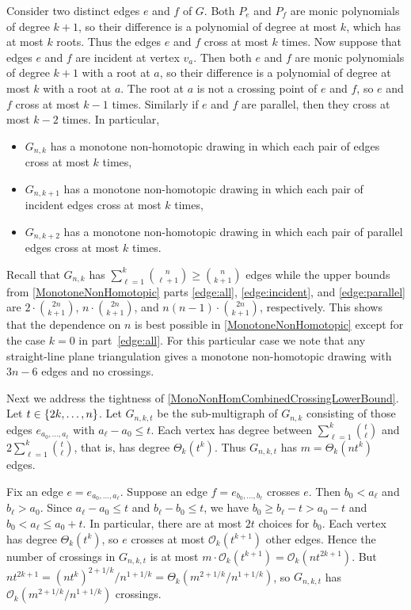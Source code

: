 \documentclass[a4paper,11pt]{article}
\renewcommand{\geq}{\geqslant}
\renewcommand{\leq}{\leqslant}
\DeclarePairedDelimiter{\set}{\lbrace}{\rbrace} %
\newcommand{\OO}{\mathcal{O}}
\begin{document}
Consider two distinct edges $e$ and $f$ of $G$. Both $P_e$ and $P_f$ are monic polynomials of degree $k + 1$, so their difference is a polynomial of degree at most $k$, which has at most $k$ roots. Thus the edges $e$ and $f$ cross at most $k$ times. Now suppose that edges $e$ and $f$ are incident at vertex $v_a$. Then both $e$ and $f$ are monic polynomials of degree $k + 1$ with a root at $a$, so their difference is a polynomial of degree at most $k$ with a root at $a$. The root at $a$ is not a crossing point of $e$ and $f$, so $e$ and $f$ cross at most $k - 1$ times. Similarly if $e$ and $f$ are parallel, then they cross at most $k - 2$ times. In particular,
\begin{itemize}
    \item $G_{n, k}$ has a monotone non-homotopic drawing in which each pair of edges cross at most $k$ times,
    \item $G_{n, k + 1}$ has a monotone non-homotopic drawing in which each pair of incident edges cross at most $k$ times,
    \item $G_{n, k + 2}$ has a monotone non-homotopic drawing in which each pair of parallel edges cross at most $k$ times.
\end{itemize}
Recall that $G_{n, k}$ has $\sum_{\ell = 1}^k \binom{n}{\ell + 1} \geq \binom{n}{k + 1}$ edges while the upper bounds from \cref{MonotoneNonHomotopic} parts \ref{edge:all}, \ref{edge:incident}, and \ref{edge:parallel} are $2 \cdot \binom{2n}{k + 1}$, $n \cdot \binom{2n}{k + 1}$, and $n (n - 1) \cdot \binom{2n}{k + 1}$, respectively.
This shows that the dependence on $n$ is best possible in \cref{MonotoneNonHomotopic} except for the case $k = 0$ in part~\ref{edge:all}. For this particular case we note that any straight-line plane triangulation gives a monotone non-homotopic drawing with $3n - 6$ edges and no crossings.

Next we address the tightness of \cref{MonoNonHomCombinedCrossingLowerBound}. Let $t \in \set{2k, \dotsc, n}$. Let $G_{n, k, t}$ be the sub-multigraph of $G_{n, k}$ consisting of those edges $e_{a_0, \dotsc, a_{\ell}}$ with $a_{\ell} - a_0 \leq t$. Each vertex has degree between $\sum_{\ell = 1}^k \binom{t}{\ell}$ and $2 \sum_{\ell = 1}^k \binom{t}{\ell}$, that is, has degree $\Theta_k(t^k)$. Thus $G_{n, k, t}$ has $m = \Theta_k(n t^k)$ edges.

Fix an edge $e = e_{a_0, \dotsc, a_{\ell}}$. Suppose an edge $f = e_{b_0, \dotsc, b_{\ell}}$ crosses $e$. Then $b_0 < a_{\ell}$ and $b_{\ell} > a_0$. Since $a_{\ell} - a_0 \leq t$ and $b_{\ell} - b_0 \leq t$, we have $b_0 \geq b_{\ell} - t > a_0 - t$ and $b_0 < a_{\ell} \leq a_0 + t$. In particular, there are at most $2t$ choices for $b_0$. Each vertex has degree $\Theta_k(t^k)$, so $e$ crosses at most $\OO_k(t^{k + 1})$ other edges. Hence the number of crossings in $G_{n, k, t}$ is at most $m \cdot \OO_k(t^{k + 1}) = \OO_k(n t^{2k + 1})$. But $n t^{2k + 1} = (n t^k)^{2 + 1/k}/n^{1 + 1/k} = \Theta_k(m^{2 + 1/k}/n^{1 + 1/k})$, so $G_{n, k, t}$ has $\OO_k(m^{2 + 1/k}/n^{1 + 1/k})$ crossings.
\end{document}
